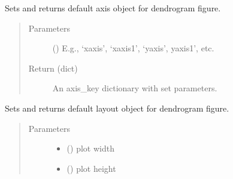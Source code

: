 \documentclass[letterpaper,10pt,english]{sphinxmanual}
\begin{document}
\begin{fulllineitems}
\begin{fulllineitems}
\label{\detokenize{_autosummary/analytics_core.viz:analytics_core.viz.Dendrogram.Dendrogram.set_axis_layout}}
Sets and returns default axis object for dendrogram figure.
\begin{quote}\begin{description}
\item[{Parameters}] \leavevmode
{} () \textendash{} E.g., ‘xaxis’, ‘xaxis1’, ‘yaxis’, yaxis1’, etc.

\item[{Return (dict)}] \leavevmode
An axis\_key dictionary with set parameters.

\end{description}\end{quote}

\end{fulllineitems}


\begin{fulllineitems}
\label{\detokenize{_autosummary/analytics_core.viz:analytics_core.viz.Dendrogram.Dendrogram.set_figure_layout}}
Sets and returns default layout object for dendrogram figure.
\begin{quote}\begin{description}
\item[{Parameters}] \leavevmode\begin{itemize}
\item {} 
 () \textendash{} plot width

\item {} 
 () \textendash{} plot height


\end{itemize}
\end{description}
\end{quote}
\end{fulllineitems}
\end{fulllineitems}
\end{document}
